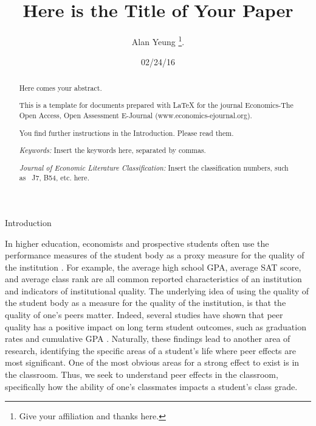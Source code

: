 \documentclass[12pt,a4paper,english,fleqn]{article}
\date{02/24/16}
\makeatletter
\renewcommand\section{\@startsection{section}{1}{\z@}
{-5ex \@plus -1ex \@minus -.2ex}{2.3ex \@plus.2ex}{\normalfont\large\bf}}
\makeatother
\begin{document}
\title{Here is the Title of Your Paper}


\author{Alan Yeung%
\thanks{Give your affiliation and thanks here.%
}.}
\maketitle
\begin{abstract}
\noindent Here comes your abstract.

This is a template for documents prepared with \LaTeX{} for the journal
Economics-The Open Access, Open Assessment E-Journal (www.economics-ejournal.org).

You find further instructions in the Introduction. Please read them.

\noindent \medskip{}


\noindent \emph{Keywords: }Insert the keywords here, separated by
commas.

\noindent \emph{Journal of Economic Literature Classification: }Insert
the classification numbers, such as \ J7, B54,\emph{ }etc. here\emph{.}
\end{abstract}


\newpage{}

\doublespacing

\section{Introduction}\label{intro}

In higher education, economists and prospective students often use the performance measures of the student body as a proxy measure for the quality of the institution \citep{smith2015new,sarmiento2015quality,black2006estimating}.
For example, the average high school GPA, average SAT score, and average class rank are all common reported characteristics of an institution and indicators of institutional quality.
The underlying idea of using the quality of the student body as a measure for the quality of the institution, is that the quality of one's peers matter. 
Indeed, several studies have shown that peer quality has a positive impact on long term student outcomes, such as graduation rates and cumulative GPA \citep{smith2015new,luppino2015college,ost2010role}. 
Naturally, these findings lead to another area of research, identifying the specific areas of a student's life where peer effects are most significant. 
One of the most obvious areas for a strong effect to exist is in the classroom.
Thus, we seek to understand peer effects in the classroom, specifically how the ability of one's classmates impacts a student's class grade.
\end{document}
